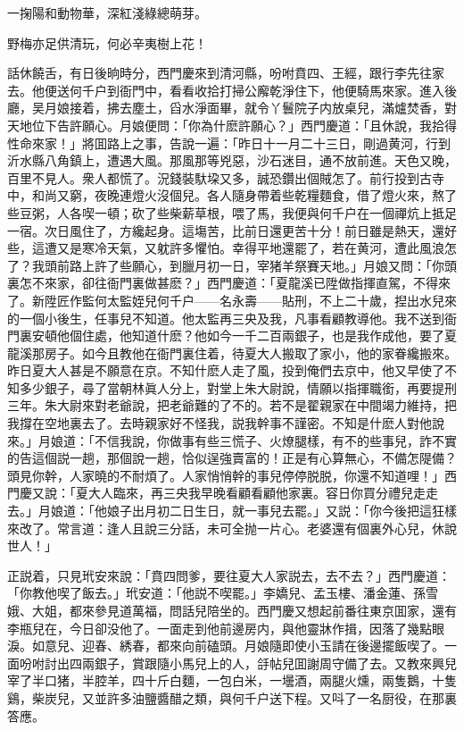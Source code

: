\begin{myquote}
一掬陽和動物華，深紅淺綠總萌芽。

野梅亦足供清玩，何必辛夷樹上花！
\end{myquote}

話休饒舌，有日後晌時分，西門慶來到清河縣，吩咐賁四、王經，跟行李先往家去。他便送何千户到衙門中，看看收拾打掃公廨乾淨住下，他便騎馬來家。進入後廳，吴月娘接着，拂去塵土，舀水淨面畢，就令丫鬟院子内放桌兒，滿爐焚香，對天地位下告許願心。月娘便問：「你為什麽許願心？」西門慶道：「且休說，我拾得性命來家！」將囬路上之事，告說一遍：「昨日十一月二十三日，剛過黄河，行到沂水縣八角鎮上，遭遇大風。那風那等兇惡，沙石迷目，通不放前進。天色又晚，百里不見人。衆人都慌了。況錢裝馱垜又多，誠恐鑽出個賊怎了。前行投到古寺中，和尚又窮，夜晚連燈火沒個兒。各人隨身帶着些乾糧麵食，借了燈火來，熬了些豆粥，人各喫一頓；砍了些柴薪草根，喂了馬，我便與何千户在一個禪炕上抵足一宿。次日風住了，方纔起身。這塲苦，比前日還更苦十分！前日雖是熱天，還好些，這遭又是寒冷天氣，又躭許多懼怕。幸得平地還罷了，若在黄河，遭此風浪怎了？我頭前路上許了些願心，到臘月初一日，宰猪羊祭賽天地。」月娘又問：「你頭裏怎不來家，卻往衙門裏做甚麽？」西門慶道：「夏龍溪已陞做指揮直駕，不得來了。新陞匠作監何太監姪兒何千户——名永壽——貼刑，不上二十歲，揑出水兒來的一個小後生，任事兒不知道。他太監再三央及我，凡事看顧教導他。我不送到衙門裏安頓他個住處，他知道什麽？他如今一千二百兩銀子，也是我作成他，要了夏龍溪那房子。如今且教他在衙門裏住着，待夏大人搬取了家小，他的家眷纔搬來。昨日夏大人甚是不願意在京。不知什麽人走了風，投到俺們去京中，他又早使了不知多少銀子，尋了當朝林眞人分上，對堂上朱大尉說，情願以指揮職銜，再要提刑三年。朱大尉來對老爺說，把老爺難的了不的。若不是翟親家在中間竭力維持，把我撐在空地裏去了。去時親家好不怪我，説我幹事不謹密。不知是什麽人對他說來。」月娘道：「不信我說，你做事有些三慌子、火燎腿樣，有不的些事兒，詐不實的告這個説一趟，那個說一趟，恰似逞強賣富的！正是有心算無心，不備怎隄備？頭見你幹，人家曉的不耐煩了。人家悄悄幹的事兒停停脱脱，你還不知道哩！」西門慶又說：「夏大人臨來，再三央我早晚看顧看顧他家裏。容日你買分禮兒走走去。」月娘道：「他娘子出月初二日生日，就一事兒去罷。」又説：「你今後把這狂樣來改了。常言道：逢人且說三分話，未可全抛一片心。老婆還有個裏外心兒，休說世人！」

正説着，只見玳安來說：「賁四問爹，要往夏大人家説去，去不去？」西門慶道：「你教他喫了飯去。」玳安道：「他説不喫罷。」李嬌兒、孟玉樓、潘金蓮、孫雪娥、大姐，都來參見道萬福，問話兒陪坐的。西門慶又想起前番往東京囬家，還有李瓶兒在，今日卻没他了。一面走到他前邊房内，與他靈牀作揖，因落了幾點眼淚。如意兒、迎春、綉春，都來向前磕頭。月娘隨即使小玉請在後邊擺飯喫了。一面吩咐討出四兩銀子，賞跟隨小馬兒上的人，㧱帖兒囬謝周守備了去。又教來興兒宰了半口猪，半腔羊，四十斤白麵，一包白米，一壜酒，兩腿火燻，兩隻鵝，十隻鷄，柴炭兒，又並許多油鹽醬醋之類，與何千户送下程。又呌了一名厨役，在那裏答應。

